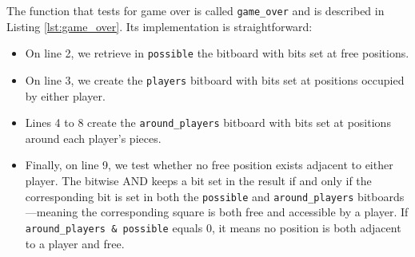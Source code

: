 \documentclass[12pt,a4paper,twoside,openright]{book}
\begin{document}
The function that tests for game over is called \texttt{game_over} and is described in Listing \ref{lst:game_over}. Its implementation is straightforward:

\begin{itemize}

\item On line 2, we retrieve in \texttt{possible} the bitboard with bits set at free positions.

\item On line 3, we create the \texttt{players} bitboard with bits set at positions occupied by either player.

\item Lines 4 to 8 create the \texttt{around_players} bitboard with bits set at positions around each player's pieces.

\item Finally, on line 9, we test whether no free position exists adjacent to either player. The bitwise AND keeps a bit set in the result if and only if the corresponding bit is set in both the \texttt{possible} and \texttt{around_players} bitboards—meaning the corresponding square is both free and accessible by a player. If \texttt{around_players & possible} equals $0$, it means no position is both adjacent to a player and free.

\end{itemize}
\end{document}
